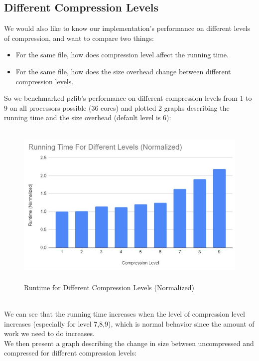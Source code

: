 \documentclass[12pt]{article}
\begin{document}
    \subsection{Different Compression Levels}
    We would also like to know our implementation's performance on different levels of compression, and want to compare two things:
    \begin{itemize}
        \item For the same file, how does compression level affect the running time.
        \item For the same file, how does the size overhead change between different compression levels.
    \end{itemize}
    So we benchmarked pzlib's performance on different compression levels from 1 to 9 on all processors possible (36 cores) and plotted 2 graphs describing the running time and the size overhead (default level is 6):
    \begin{figure}[!h]
    \begin{center}
    \includegraphics[height=8cm]{RuntimeCompressionLevel.JPG}
    \caption{Runtime for Different Compression Levels (Normalized)}
    \end{center}
    \end{figure}
    ~\\
    We can see that the running time increases when the level of compression level increases (especially for level 7,8,9), which is normal behavior since the amount of work we need to do increases.\\
    We then present a graph describing the change in size between uncompressed and compressed for different compression levels:
    \newpage
\end{document}
